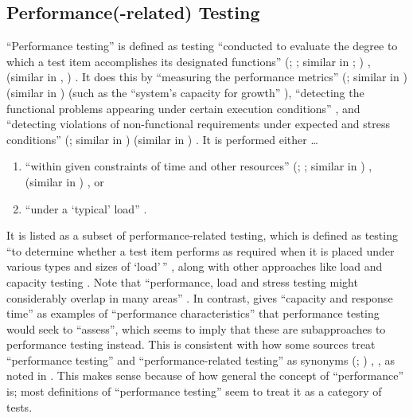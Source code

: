 \scalGraphs{}

\subsection{Performance(-related) Testing}
\label{perf-test-rec}

``Performance testing'' is defined as testing ``conducted to evaluate the
degree to which a test item accomplishes its designated functions''
\ifnotpaper
    (\citealp[p.~7]{IEEE2022}; \citeyear[p.~320]{IEEE2017}; similar in
    \citeyear[pp.~38-39]{IEEE2021b}; \citealp[p.~1187]{Moghadam2019})%
\else
    \cite[p.~320]{IEEE2017}, \cite[p.~7]{IEEE2022} (similar in
    \cite[pp.~38-39]{IEEE2021b}, \cite[p.~1187]{Moghadam2019})%
\fi. It does this
by ``measuring the performance metrics''
\ifnotpaper
    (\citealp[p.~1187]{Moghadam2019}; similar in \citealpISTQB{})
\else
    \cite[p.~1187]{Moghadam2019} (similar in \cite{ISTQB})
\fi (such as the ``system's capacity for growth''
\citep[p.~23]{Gerrard2000b}), ``detecting the functional problems appearing
under certain execution conditions'' \citep[p.~1187]{Moghadam2019}, and
``detecting violations of non-functional requirements under expected and
stress conditions'' \ifnotpaper
    (\citealp[p.~1187]{Moghadam2019}; similar in \citealp[p.~5-9]{SWEBOK2024})%
\else
    \cite[p.~1187]{Moghadam2019} (similar in \cite[p.~5-9]{SWEBOK2024})%
\fi. It is performed either \dots\
\begin{enumerate}
    \item ``within given constraints of time and other resources''
          \ifnotpaper
              (\citealp[p.~7]{IEEE2022}; \citeyear[p.~320]{IEEE2017};
              similar in \citealp[p.~1187]{Moghadam2019})%
          \else
              \cite[p.~320]{IEEE2017}, \cite[p.~7]{IEEE2022} (similar
              in \cite[p.~1187]{Moghadam2019})%
          \fi, or
    \item ``under a `typical' load'' \citep[p.~39]{IEEE2021b}.
\end{enumerate}

It is listed as a subset of performance-related testing, which is defined as
testing ``to determine whether a test item performs as required when it is
placed under various types and sizes of `load'\,'' \citeyearpar[p.~38]{IEEE2021b},
along with other approaches like load and capacity testing
\citep[p.~22]{IEEE2022}. Note that ``performance, load and stress testing might
considerably overlap in many areas'' \citep[p.~1187]{Moghadam2019}.
In contrast, \citet[p.~5-9]{SWEBOK2024}
gives ``capacity and response time'' as examples of ``performance
characteristics'' that performance testing would seek to ``assess'', which
seems to imply that these are subapproaches to performance testing instead.
This is consistent with how some sources treat ``performance testing'' and
``performance-related testing'' as synonyms \ifnotpaper
    (\citealp[p.~5-9]{SWEBOK2024}; \citealp[p.~1187]{Moghadam2019})%
\else \cite[p.~5-9]{SWEBOK2024}, \cite[p.~1187]{Moghadam2019}%
\fi, as noted in . This makes sense because of how general the
concept of ``performance'' is; most definitions of ``performance testing'' seem
to treat it as a category of tests.

